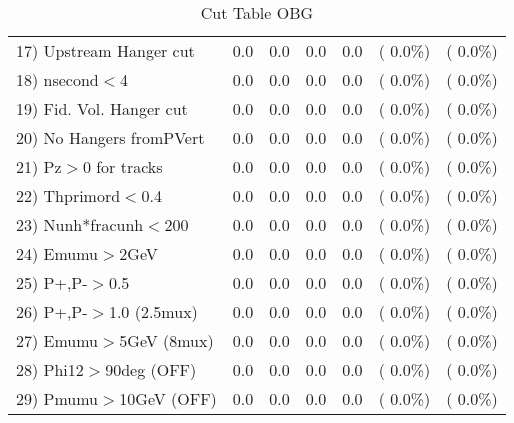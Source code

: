 \begin{table}[h!]
\begin{tabular}{||l||r|r|r|r|r|r||}
 17) Upstream Hanger cut  &          0.0 &          0.0 &          0.0 &          0.0 & (  0.0\%) & (  0.0\%) \\
 18) nsecond$<$4          &          0.0 &          0.0 &          0.0 &          0.0 & (  0.0\%) & (  0.0\%) \\
 19) Fid. Vol. Hanger cut &          0.0 &          0.0 &          0.0 &          0.0 & (  0.0\%) & (  0.0\%) \\
 20) No Hangers fromPVert &          0.0 &          0.0 &          0.0 &          0.0 & (  0.0\%) & (  0.0\%) \\
 21) Pz$>$0 for tracks    &          0.0 &          0.0 &          0.0 &          0.0 & (  0.0\%) & (  0.0\%) \\
 22) Thprimord$<$0.4      &          0.0 &          0.0 &          0.0 &          0.0 & (  0.0\%) & (  0.0\%) \\
 23) Nunh*fracunh$<$200   &          0.0 &          0.0 &          0.0 &          0.0 & (  0.0\%) & (  0.0\%) \\
 24) Emumu$>$2GeV         &          0.0 &          0.0 &          0.0 &          0.0 & (  0.0\%) & (  0.0\%) \\
 25) P+,P-$>$0.5          &          0.0 &          0.0 &          0.0 &          0.0 & (  0.0\%) & (  0.0\%) \\
 26) P+,P-$>$1.0 (2.5mux) &          0.0 &          0.0 &          0.0 &          0.0 & (  0.0\%) & (  0.0\%) \\
 27) Emumu$>$5GeV  (8mux) &          0.0 &          0.0 &          0.0 &          0.0 & (  0.0\%) & (  0.0\%) \\
 28) Phi12$>$90deg  (OFF) &          0.0 &          0.0 &          0.0 &          0.0 & (  0.0\%) & (  0.0\%) \\
 29) Pmumu$>$10GeV  (OFF) &          0.0 &          0.0 &          0.0 &          0.0 & (  0.0\%) & (  0.0\%) \\
 \hline
 \hline
 \end{tabular}
 \caption{Cut Table  OBG      }
 \label{tab-cutcohjpsi-mumu_qe}
 \end{table}
